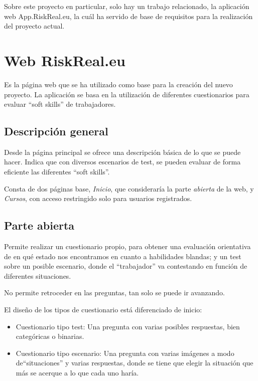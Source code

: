 
Sobre este proyecto en particular, solo hay un trabajo relacionado, la aplicación web App.RiskReal.eu, la cuál ha servido de base de requisitos para la realización del proyecto actual.

\section{Web RiskReal.eu}
Es la página web \cite{web:riskreal} que se ha utilizado como base para la creación del nuevo proyecto.
La aplicación se basa en la utilización de diferentes cuestionarios para evaluar ``soft skills'' de trabajadores.

\subsection{Descripción general}
Desde la página principal se ofrece una descripción básica de lo que se puede hacer.
Indica que con diversos escenarios de test, se pueden evaluar de forma eficiente las diferentes ``soft skills''.

Consta de dos páginas base, \textit{Inicio}, que consideraría la parte \textit{abierta} de la web, y \textit{Cursos}, con acceso restringido solo para usuarios registrados.

\subsection{Parte abierta}
Permite realizar un cuestionario propio, para obtener una evaluación orientativa de en qué estado nos encontramos en cuanto a habilidades blandas; y un test sobre un posible escenario, donde el ``trabajador'' va contestando en función de diferentes situaciones.

No permite retroceder en las preguntas, tan solo se puede ir avanzando.

El diseño de los tipos de cuestionario está diferenciado de inicio:

\begin{itemize}
	\item Cuestionario tipo test: Una pregunta con varias posibles respuestas, bien categóricas o binarias.
	\item Cuestionario tipo escenario: Una pregunta con varias imágenes a modo de``situaciones'' y varias respuestas, donde se tiene que elegir la situación que más se acerque a lo que cada uno haría.
\end{itemize}

